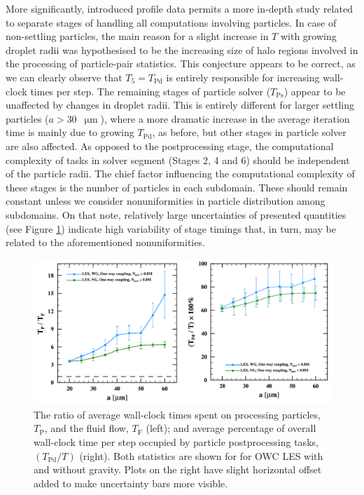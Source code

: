 \documentclass{pracamgren}
\begin{document}
More significantly, introduced profile data permits a more in-depth study related to separate stages of handling all computations involving particles.
In case of non-settling particles, the main reason for a slight increase in $T$ with growing droplet radii was hypothesised to be the increasing size of halo regions involved in the processing of particle-pair statistics.
This conjecture appears to be correct, as we can clearly observe that $T_5 = T_{\text{Pd}}$ is entirely responsible for increasing wall-clock times per step.
The remaining stages of particle solver ($T_{\text{Ps}}$) appear to be unaffected by changes in droplet radii.
This is entirely different for larger settling particles ($a > 30$~$\upmu\text{m}$), where a more dramatic increase in the average iteration time is mainly due to growing $T_{\text{Pd}}$, as before, but other stages in particle solver are also affected.
As opposed to the postprocessing stage, the computational complexity of tasks in solver segment (Stages 2, 4 and 6) should be independent of the particle radii.
The chief factor influencing the computational complexity of these stages is the number of particles in each subdomain.
These should remain constant unless we consider nonuniformities in particle distribution among subdomains.
On that note, relatively large uncertainties of presented quantities (see Figure \ref{fig:pffowclesex}) indicate high variability of stage timings that, in turn, may be related to the aforementioned nonuniformities.

\begin{figure}[h]
\centering
\includegraphics[width=13.5cm]{figures/3-07_pffowclesex.pdf}
\caption{
The ratio of average wall-clock times spent on processing particles, $T_{\text{P}}$, and the fluid flow, $T_{\text{F}}$ (left); and average percentage of overall wall-clock time per step occupied by particle postprocessing tasks, $(T_{\text{Pd}} / T)$ (right).
Both statistics are shown for for OWC LES with and without gravity.
Plots on the right have slight horizontal offset added to make uncertainty bars more visible.
}
\label{fig:pffowclesex}
\end{figure}
\end{document}
